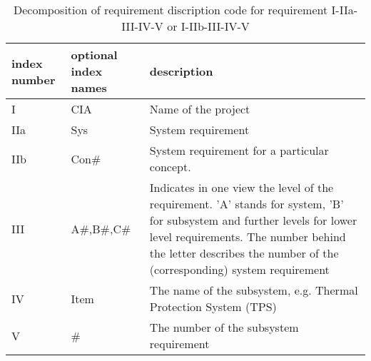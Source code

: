 \begin{table}[H]
    \caption {Decomposition of requirement discription code for requirement I-IIa-III-IV-V or I-IIb-III-IV-V}
    \begin{tabular}{|p{}|p{}|p{}|}
    \hline
    index number & optional index names    & description                                                                                                                                  \\ \hline \hline
    I            & CIA                     & Name of the project                                                                                                                           \\ \hline
    IIa           & Sys                     & System requirement                                                                                                                           \\ \hline
    IIb            & Con\#                    & System requirement for a particular concept.
\\ \hline
    III            & A\#,B\#,C\#                & Indicates in one view the level of the requirement. 'A' stands for system, 'B' for subsystem  and further levels for lower level requirements. The number behind the letter describes the number of the (corresponding) system requirement
\\ \hline
    IV            & Item                    & The name of the subsystem, e.g. Thermal Protection System (TPS)                                                                                                 \\ \hline
    V            & \#			           & The number of the subsystem requirement                                                                                                      \\ \hline
    \end{tabular}
    \label{tab:description}
\end{table}

